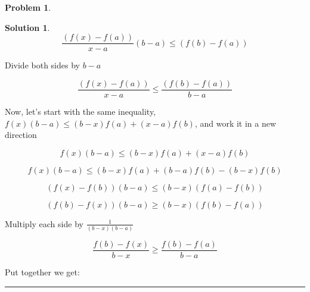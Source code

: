 \documentclass{article}
\theoremstyle{definition}
\newtheorem{problem}{Problem}
\def\fline{\rule{0.75\linewidth}{0.5pt}}
\newcommand{\finishline}{\begin{center}\fline\end{center}}
\newtheorem*{solution*}{Solution}
\newenvironment{solution}{\begin{solution*}}{{\finishline} \end{solution*}}
\begin{document}
\begin{problem}
\begin{enumerate}
\begin{solution}
                    \begin{equation}
                        \label{eq:example}
                            \frac{(f(x) - f(a))}{x - a} (b - a) \leq (f(b) - f(a))
                    \end{equation}

                    Divide both sides by $b - a$

                    \begin{equation}
                        \label{eq:example}
                            \frac{(f(x) - f(a))}{x - a}  \leq \frac{(f(b) - f(a))}{b - a}
                    \end{equation}

Now, let's start with the same inequality, $f(x) (b - a) \leq (b - x) f(a) + (x - a) f(b)$, and work it in a new direction


                    \begin{equation}
                        \label{eq:example}
                            f(x) (b - a) \leq (b - x) f(a) + (x - a) f(b)
                    \end{equation}

                    \begin{equation}
                        \label{eq:example}
                            f(x) (b - a) \leq (b - x) f(a) + (b - a) f(b) - (b - x) f(b)
                    \end{equation}

                    \begin{equation}
                        \label{eq:example}
                            (f(x) - f(b)) (b - a) \leq (b - x) (f(a) - f(b))
                    \end{equation}

                    \begin{equation}
                        \label{eq:example}
                            (f(b) - f(x)) (b - a) \geq (b - x) (f(b) - f(a))
                    \end{equation}

Multiply each side by $\frac{1}{(b - x)(b - a)}$

                    \begin{equation}
                        \label{eq:example}
                            \frac{f(b) - f(x)}{b - x} \geq \frac{f(b) - f(a)}{b - a}
                    \end{equation}

Put together we get: \newline 


\end{solution}
\end{enumerate}
\end{problem}
\end{document}
